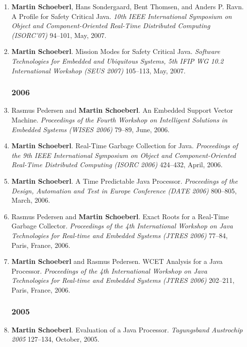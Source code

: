 \begin{enumerate}
\item {\bf Martin Schoeberl}, Hans Sondergaard, Bent Thomsen, and Anders P. Ravn.
 A Profile for Safety Critical Java.
 \emph{10th IEEE International Symposium on Object and Component-Oriented Real-Time Distributed Computing (ISORC'07)} 94--101, May, 2007.

\item {\bf Martin Schoeberl}.
 Mission Modes for Safety Critical Java.
 \emph{Software Technologies for Embedded and Ubiquitous Systems, 5th {IFIP} {WG} 10.2 International Workshop (SEUS 2007)} 105--113, May, 2007.


\subsubsection*{2006}

\item Rasmus Pedersen and {\bf Martin Schoeberl}.
 An Embedded Support Vector Machine.
 \emph{Proceedings of the Fourth Workshop on Intelligent Solutions in Embedded Systems (WISES 2006)} 79--89, June, 2006.

\item {\bf Martin Schoeberl}.
 Real-Time Garbage Collection for Java.
 \emph{Proceedings of the 9th IEEE International Symposium on Object and Component-Oriented Real-Time Distributed Computing (ISORC 2006)} 424--432, April, 2006.

\item {\bf Martin Schoeberl}.
 A Time Predictable Java Processor.
 \emph{Proceedings of the Design, Automation and Test in Europe Conference (DATE 2006)} 800--805, March, 2006.

\item Rasmus Pedersen and {\bf Martin Schoeberl}.
 Exact Roots for a Real-Time Garbage Collector.
 \emph{Proceedings of the 4th International Workshop on Java Technologies for Real-time and Embedded Systems (JTRES 2006)} 77--84, Paris, France, 2006.

\item {\bf Martin Schoeberl} and Rasmus Pedersen.
 WCET Analysis for a Java Processor.
 \emph{Proceedings of the 4th International Workshop on Java Technologies for Real-time and Embedded Systems (JTRES 2006)} 202--211, Paris, France, 2006.


\subsubsection*{2005}

\item {\bf Martin Schoeberl}.
 Evaluation of a Java Processor.
 \emph{Tagungsband Austrochip 2005} 127--134, October, 2005.


\end{enumerate}
